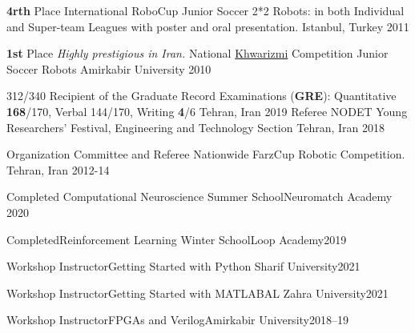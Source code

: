 \begin{cvhonors}
   \cvhonor
   {\textbf{4rth} Place}
    {International RoboCup Junior Soccer 2*2 Robots: in both Individual and Super-team Leagues with poster and oral presentation.}
    {Istanbul, Turkey}
	{2011}
  
    
  \cvhonor
  {\textbf{1st} Place}
  {\textit{Highly prestigious in Iran.} National \href{https://en.wikipedia.org/wiki/Khwarizmi_International_Award}{Khwarizmi} Competition Junior Soccer Robots}
  {Amirkabir University}
	{2010}
\end{cvhonors}






\begin{cvhonors}

  \cvhonor
    {312/340} %
    {Recipient of the Graduate Record Examinations (\textbf{GRE}): Quantitative \textbf{168}/170, Verbal 144/170, Writing \textbf{4}/6} %
    {Tehran, Iran} %
    {2019} %
     \cvhonor
  {Referee}
  {NODET Young Researchers’ Festival, Engineering and Technology Section}
  {Tehran, Iran}
	{2018}

  \cvhonor
    {Organization Committee and Referee}
    {Nationwide FarzCup Robotic Competition.}
    {Tehran, Iran}
    {2012-14}

    
\cvhonor
{Completed}
{Computational Neuroscience Summer School}{Neuromatch Academy}
{2020}

\cvhonor
{Completed}{Reinforcement Learning Winter School}{Loop Academy}{2019}

\cvhonor
{Workshop Instructor}{Getting Started with Python}{ Sharif University}{2021}

\cvhonor
{Workshop Instructor}{Getting Started with MATLAB}{AL Zahra University}{2021}

\cvhonor
{Workshop Instructor}{FPGAs and Verilog}{Amirkabir University}{2018–19}
\end{cvhonors}